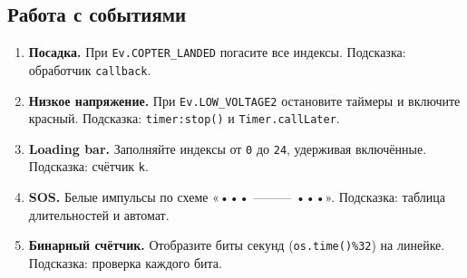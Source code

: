 \documentclass[a4paper,12pt]{article}
\begin{document}
\subsection{Работа с событиями}
\begin{enumerate}[resume]
  \item \textbf{Посадка.} При \verb|Ev.COPTER_LANDED| погасите все индексы. Подсказка: обработчик \verb|callback|.
  \item \textbf{Низкое напряжение.} При \verb|Ev.LOW_VOLTAGE2| остановите таймеры и включите красный. Подсказка: \verb|timer:stop()| и \verb|Timer.callLater|.
  \item \textbf{Loading bar.} Заполняйте индексы от \verb|0| до \verb|24|, удерживая включённые. Подсказка: счётчик \verb|k|.
  \item \textbf{SOS.} Белые импульсы по схеме «••• ——— •••». Подсказка: таблица длительностей и автомат.
  \item \textbf{Бинарный счётчик.} Отобразите биты секунд (\verb|os.time()%32|) на линейке. Подсказка: проверка каждого бита.
\end{enumerate}
\end{document}
